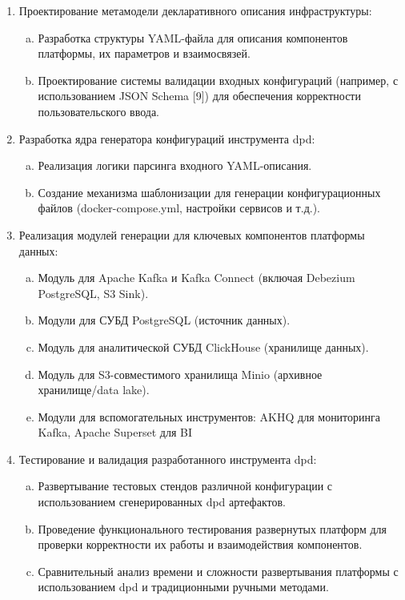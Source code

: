 \begin{enumerate}[1.]
	\item Проектирование метамодели декларативного описания инфраструктуры:
	      \begin{enumerate}[a.]
		      \item Разработка структуры YAML-файла для описания компонентов платформы, их параметров и взаимосвязей.
		      \item Проектирование системы валидации входных конфигураций (например, с использованием JSON Schema [9]) для обеспечения корректности пользовательского ввода.
	      \end{enumerate}
	\item Разработка ядра генератора конфигураций инструмента dpd:
	      \begin{enumerate}[a.]
		      \item Реализация логики парсинга входного YAML-описания.
		      \item Создание механизма шаблонизации для генерации конфигурационных файлов (docker-compose.yml, настройки сервисов и т.д.).
	      \end{enumerate}
	\item Реализация модулей генерации для ключевых компонентов платформы данных:
	      \begin{enumerate}[a.]
		      \item Модуль для Apache Kafka и Kafka Connect (включая Debezium PostgreSQL, S3 Sink).
		      \item Модули для СУБД PostgreSQL (источник данных).
		      \item Модуль для аналитической СУБД ClickHouse (хранилище данных).
		      \item Модуль для S3-совместимого хранилища Minio (архивное хранилище/data lake).
		      \item Модули для вспомогательных инструментов: AKHQ для мониторинга Kafka, Apache Superset для BI
	      \end{enumerate}
	\item Тестирование и валидация разработанного инструмента dpd:
	      \begin{enumerate}[a.]
		      \item Развертывание тестовых стендов различной конфигурации с использованием сгенерированных dpd артефактов.
		      \item Проведение функционального тестирования развернутых платформ для проверки корректности их работы и взаимодействия компонентов.
		      \item Сравнительный анализ времени и сложности развертывания платформы с использованием dpd и традиционными ручными методами.
	      \end{enumerate}
\end{enumerate}


